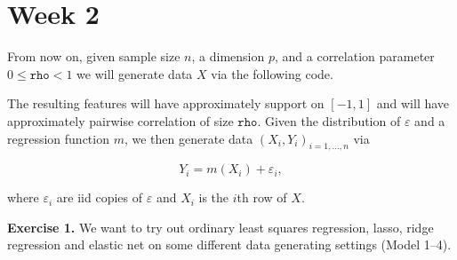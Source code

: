 \documentclass[a4paper,12pt,openany]{book}
\begin{document}
\hypertarget{week-2-1}{%
\section{Week 2}\label{week-2-1}}

From now on, given sample size \(n\), a dimension \(p\), and a correlation parameter \(0\le \texttt{rho}<1\) we will generate data \(X\) via the following code.

The resulting features will have approximately support on \([−1, 1]\) and will have approximately pairwise correlation of size \(\texttt{rho}\). Given the distribution of \(\varepsilon\) and a regression function \(m\), we then generate data \((X_i,Y_i)_{i=1,...,n}\) via

\[
Y_i=m(X_i)+\varepsilon_i,
\]

where \(\varepsilon_i\) are iid copies of \(\varepsilon\) and \(X_i\) is the \(i\)th row of \(X\).

\textbf{Exercise 1.} We want to try out ordinary least squares regression, lasso, ridge regression and elastic net on some different data generating settings (Model 1--4).
\end{document}
